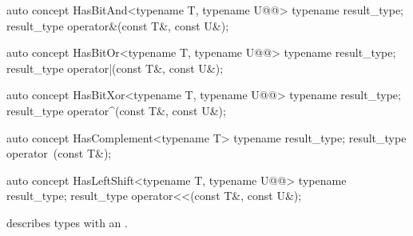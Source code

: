 \documentclass[american,twoside]{book}
\begin{document}
\begin{itemdecl}
auto concept HasBitAnd<typename T, typename U@@> {
  typename result_type;
  result_type operator&(const T&, const U&);
}
\end{itemdecl}

\begin{itemdescr}
\pnum
{}
\end{itemdescr}

\begin{itemdecl}
auto concept HasBitOr<typename T, typename U@@> {
  typename result_type;
  result_type operator|(const T&, const U&);
}
\end{itemdecl}

\begin{itemdescr}
\pnum
{}
\end{itemdescr}

\begin{itemdecl}
auto concept HasBitXor<typename T, typename U@@> {
  typename result_type;
  result_type operator^(const T&, const U&);
}
\end{itemdecl}

\begin{itemdescr}
\pnum
{}
\end{itemdescr}

\begin{itemdecl}
auto concept HasComplement<typename T> {
  typename result_type;
  result_type operator~(const T&);
}
\end{itemdecl}

\begin{itemdescr}
\pnum
{}
\end{itemdescr}

\begin{itemdecl}
auto concept HasLeftShift<typename T, typename U@@> {
  typename result_type;
  result_type operator<<(const T&, const U&);
}
\end{itemdecl}

\begin{itemdescr}
\pnum
\mbox{\reallynote} describes types with an \mbox{}.
\end{itemdescr}
\end{document}
